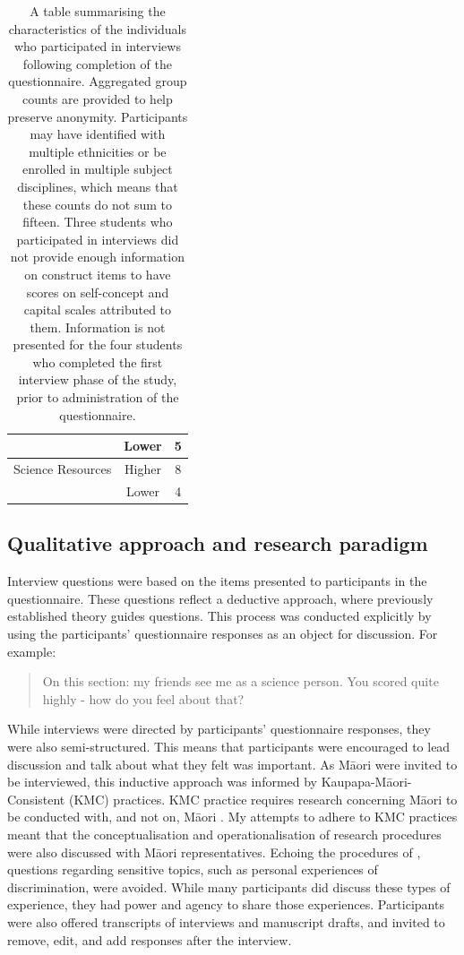\begin{table}[ht]
\begin{tabular}{cc|c}
                       & Lower                    & 5     \\ \hline
Science Resources      & Higher                   & 8     \\
                       & Lower                    & 4    
\end{tabular}
\caption{\label{tab:Demographics} A table summarising the characteristics of the individuals who participated in interviews following completion of the questionnaire. Aggregated group counts are provided to help preserve anonymity. Participants may have identified with multiple ethnicities or be enrolled in multiple subject disciplines, which means that these counts do not sum to fifteen. Three students who participated in interviews did not provide enough information on construct items to have scores on self-concept and capital scales attributed to them. Information is not presented for the four students who completed the first interview phase of the study, prior to administration of the questionnaire.}
\end{table}

\subsection{Qualitative approach and research paradigm}
Interview questions were based on the items presented to participants in the questionnaire. These questions reflect a deductive approach, where previously established theory guides questions. This process was conducted explicitly by using the participants' questionnaire responses as an object for discussion. For example: 
\blockquote{On this section: my friends see me as a science person. You scored quite highly - how do you feel about that?} While interviews were directed by participants' questionnaire responses, they were also semi-structured. This means that participants were encouraged to lead discussion and talk about what they felt was important. As M\={a}ori were invited to be interviewed, this inductive approach was informed by Kaupapa-M\={a}ori-Consistent (KMC) practices. KMC practice requires research concerning M\={a}ori to be conducted with, and not on, M\={a}ori \citep{walker2006exploration}. My attempts to adhere to KMC practices meant that the conceptualisation and operationalisation of research procedures were also discussed with M\={a}ori representatives. Echoing the procedures of \citet{mayeda2014you}, questions regarding sensitive topics, such as personal experiences of discrimination, were avoided. While many participants did discuss these types of experience, they had power and agency to share those experiences. Participants were also offered transcripts of interviews and manuscript drafts, and invited to remove, edit, and add responses after the interview.  

